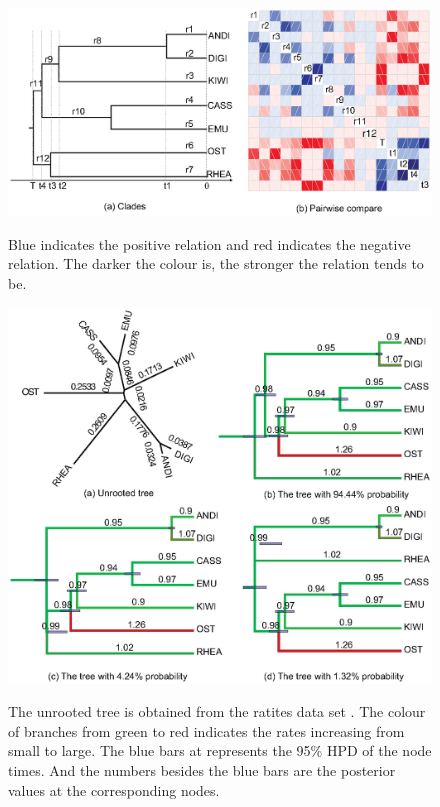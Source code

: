 \documentclass{bmcart}
\begin{document}
\begin{backmatter}
\begin{figure}[h!]
\includegraphics[width=12cm]{Fig16-correlation.eps}\\
\caption{
             Blue indicates the positive relation and red indicates the negative relation. The darker the colour is, the stronger the relation tends to be.}
\label{correlation}
\end{figure}

\begin{figure}[h!]
\includegraphics[width=12cm]{Fig17-fixedtree.eps}\\
\caption{
            The unrooted tree is obtained from the ratites data set \cite{cooper2001complete}. The colour of branches from green to red indicates the rates increasing from small to large. The blue bars at represents the 95\% HPD of the node times. And the numbers besides the blue bars are the posterior values at the corresponding nodes.}
\label{withoutdata}
\end{figure}


\end{backmatter}
\end{document}
